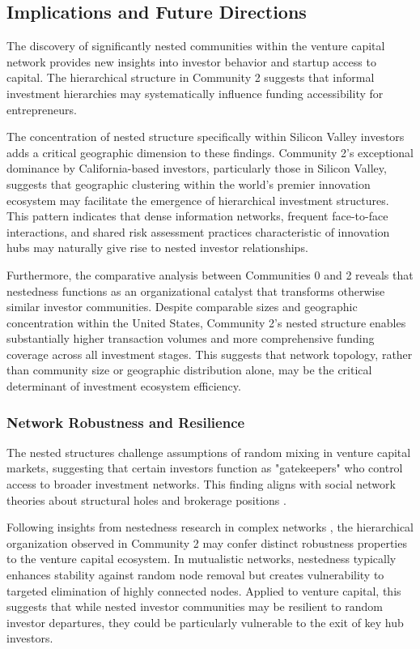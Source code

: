 
\subsection{Implications and Future Directions}

The discovery of significantly nested communities within the venture capital network provides new insights into investor behavior and startup access to capital. The hierarchical structure in Community 2 suggests that informal investment hierarchies may systematically influence funding accessibility for entrepreneurs.

The concentration of nested structure specifically within Silicon Valley investors adds a critical geographic dimension to these findings. Community 2's exceptional dominance by California-based investors, particularly those in Silicon Valley, suggests that geographic clustering within the world's premier innovation ecosystem may facilitate the emergence of hierarchical investment structures. This pattern indicates that dense information networks, frequent face-to-face interactions, and shared risk assessment practices characteristic of innovation hubs may naturally give rise to nested investor relationships.

Furthermore, the comparative analysis between Communities 0 and 2 reveals that nestedness functions as an organizational catalyst that transforms otherwise similar investor communities. Despite comparable sizes and geographic concentration within the United States, Community 2's nested structure enables substantially higher transaction volumes and more comprehensive funding coverage across all investment stages. This suggests that network topology, rather than community size or geographic distribution alone, may be the critical determinant of investment ecosystem efficiency.

\subsubsection{Network Robustness and Resilience}

The nested structures challenge assumptions of random mixing in venture capital markets, suggesting that certain investors function as "gatekeepers" who control access to broader investment networks. This finding aligns with social network theories about structural holes and brokerage positions \cite{Borgatti2011}.

Following insights from nestedness research in complex networks \cite{Mariani2019}, the hierarchical organization observed in Community 2 may confer distinct robustness properties to the venture capital ecosystem. In mutualistic networks, nestedness typically enhances stability against random node removal but creates vulnerability to targeted elimination of highly connected nodes. Applied to venture capital, this suggests that while nested investor communities may be resilient to random investor departures, they could be particularly vulnerable to the exit of key hub investors.

